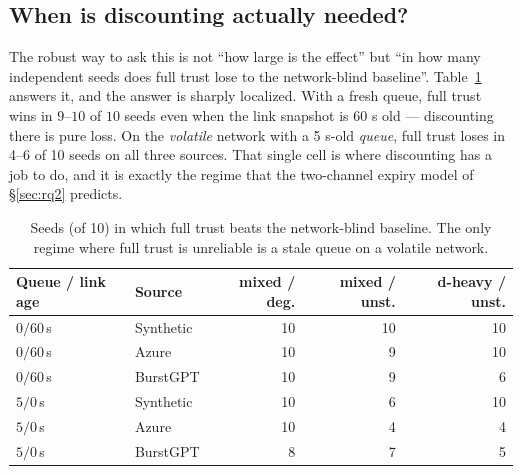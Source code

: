 \subsection{When is discounting actually needed?}
The robust way to ask this is not ``how large is the effect'' but ``in how many independent seeds
does full trust lose to the network-blind baseline''. Table~\ref{tab:seedcount} answers it, and
the answer is sharply localized. With a fresh queue, full trust wins in $9$--$10$ of $10$ seeds
even when the link snapshot is 60 s old --- discounting there is pure loss. On the
\emph{volatile} network with a 5 s-old \emph{queue}, full trust loses in 4--6 of 10
seeds on all three sources. That single cell is where discounting has a job to do, and it is
exactly the regime that the two-channel expiry model of \S\ref{sec:rq2} predicts.

\begin{table}[t]
\centering
\caption{Seeds (of 10) in which full trust beats the network-blind baseline. The only regime
where full trust is unreliable is a stale queue on a volatile network.}
\label{tab:seedcount}
\footnotesize
\setlength{\tabcolsep}{3pt}
\begin{tabular}{@{}llrrr@{}}
\toprule
Queue / link age & Source & mixed / deg. & mixed / unst. & d-heavy / unst. \\
\midrule
$0/60$\,s & Synthetic & 10 & 10 & 10 \\
$0/60$\,s & Azure     & 10 & 9  & 10 \\
$0/60$\,s & BurstGPT  & 10 & 9  & 6  \\
\midrule
$5/0$\,s  & Synthetic & 10 & 6  & 10 \\
$5/0$\,s  & Azure     & 10 & 4  & 4  \\
$5/0$\,s  & BurstGPT  & 8  & 7  & 5  \\
\bottomrule
\end{tabular}
\end{table}

